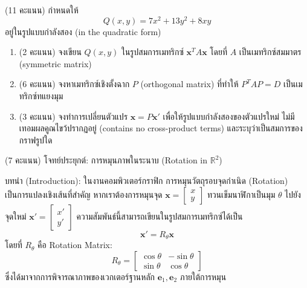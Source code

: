 \documentclass[12pt, a4paper]{exam}
\begin{document}
\begin{questions}
\question (11 คะแนน) กำหนดให้
\[ Q(x,y) = 7x^2 + 13y^2 + 8xy \]
อยู่ในรูปแบบกำลังสอง (in the quadratic form)
\begin{enumerate}[label=\textbf{4.\arabic*)}]
    \item (2 คะแนน) จงเขียน $Q(x,y)$ ในรูปสมการเมทริกซ์ $\mathbf{x}^T A \mathbf{x}$ โดยที่ $A$ เป็นเมทริกซ์สมมาตร (symmetric matrix)
    \item (6 คะแนน) จงหาเมทริกซ์เชิงตั้งฉาก $P$ (orthogonal matrix) ที่ทำให้ $P^T A P = D$ เป็นเมทริกซ์\mbox{ทแยงมุม}
    \item (3 คะแนน) จงทำการเปลี่ยนตัวแปร $\mathbf{x} = P \mathbf{x}'$ เพื่อให้รูปแบบกำลังสองของตัวแปรใหม่ ไม่มีเทอมผลคูณไขว้ปรากฏอยู่ (contains no cross-product terms) และระบุว่าเป็นสมการของกราฟรูปใด
\end{enumerate}
\newpage

\question (7 คะแนน) โจทย์ประยุกต์: การหมุนภาพในระนาบ (Rotation in $\mathbb{R}^2$)

บทนำ (Introduction): ในงานคอมพิวเตอร์กราฟิก การหมุนวัตถุรอบจุดกำเนิด (Rotation) เป็นการแปลงเชิงเส้นที่สำคัญ หากเราต้องการหมุนจุด $\mathbf{x} = \begin{bmatrix} x \\ y \end{bmatrix}$ ทวนเข็มนาฬิกาเป็นมุม $\theta$ ไปยังจุดใหม่ $\mathbf{x}' = \begin{bmatrix} x' \\ y' \end{bmatrix}$ ความสัมพันธ์นี้สามารถเขียนในรูปสมการเมทริกซ์ได้เป็น
\[ \mathbf{x}' = R_\theta \mathbf{x} \]
โดยที่ $R_\theta$ คือ Rotation Matrix:
\[ R_\theta = \begin{bmatrix} \cos\theta & -\sin\theta \\ \sin\theta & \cos\theta \end{bmatrix} \]
ซึ่งได้มาจากการพิจารณาภาพของเวกเตอร์ฐานหลัก $\mathbf{e}_1, \mathbf{e}_2$ ภายใต้การหมุน


\end{questions}
\end{document}
